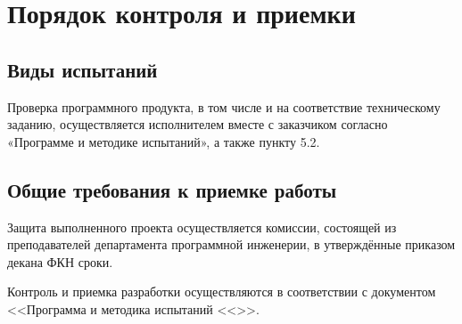 \documentclass[a4paper,12pt,reqno]{article}
\begin{document}



    \section{Порядок контроля и приемки}

    \subsection{Виды испытаний}
    Проверка программного продукта, в том числе и на соответствие техническому заданию, осуществляется исполнителем вместе с заказчиком согласно «Программе и методике испытаний», а также пункту 5.2.

    \subsection{Общие требования к приемке работы}
    Защита выполненного проекта осуществляется комиссии, состоящей из преподавателей департамента программной инженерии, в утверждённые приказом декана ФКН сроки.

    Контроль и приемка разработки осуществляются в соответствии с документом <<Программа и методика испытаний <<\unskip>>.
    \newpage

    \printbibliography[title=Список источников, heading=bibintoc]
    \newpage

    
    \newpage

    \listRegistration
\end{document}
